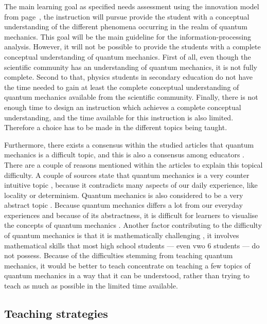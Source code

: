 \documentclass[11pt,twoside]{report} %
\begin{document}
The main learning goal as specified needs assessment using the innovation model from page~\pageref{sssec:needsassessmentinnovation}, the instruction will pursue provide the student with a conceptual understanding of the different phenomena occurring in the realm of quantum mechanics. This goal will be the main guideline for the information-processing analysis. However, it will not be possible to provide the students with a complete conceptual understanding of quantum mechanics. First of all, even though the scientific community has an understanding of quantum mechanics, it is not fully complete. Second to that, physics students in secondary education do not have the time needed to gain at least the complete conceptual understanding of quantum mechanics available from the scientific community. Finally, there is not enough time to design an instruction which achieves a complete conceptual understanding, and the time available for this instruction is also limited. Therefore a choice has to be made in the different topics being taught.

Furthermore, there exists a consensus within the studied articles that quantum mechanics is a difficult topic, and this is also a consensus among educators \cite{gianino,papaphotis1,papaphotis2}. There are a couple of reasons mentioned within the articles to explain this topical difficulty. A couple of sources state that quantum mechanics is a very counter intuitive topic \cite{henriksen, levrini, mckagan, singh2}, because it contradicts many aspects of our daily experience, like locality or determinism. Quantum mechanics is also considered to be a very abstract topic \cite{barnes, gianino, mckagan, papaphotis1, singh1}. Because quantum mechanics differs a lot from our everyday experiences and because of its abstractness, it is difficult for learners to visualise the concepts of quantum mechanics \cite{henriksen, mckagan}. Another factor contributing to the difficulty of quantum mechanics is that it is mathematically challenging \cite{gianino, mckagan}, it involves mathematical skills that most high school students --- even vwo 6 students --- do not possess. Because of the difficulties stemming from teaching quantum mechanics, it would be better to teach concentrate on teaching a few topics of quantum mechanics in a way that it can be understood, rather than trying to teach as much as possible in the limited time available.

\subsection{Teaching strategies}
\end{document}
